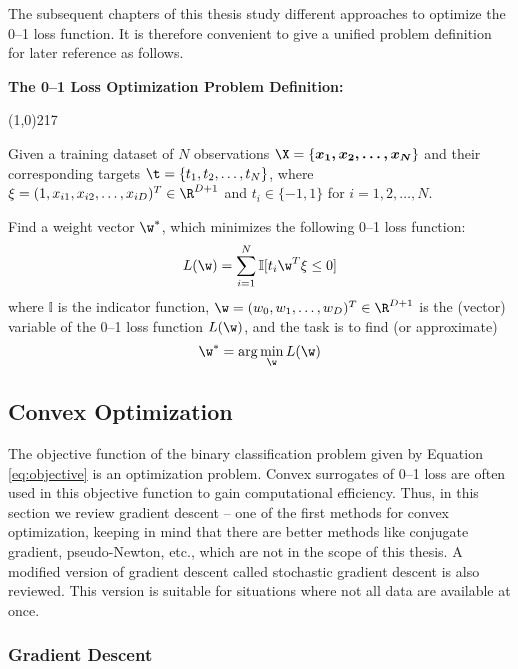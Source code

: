 The subsequent chapters of this thesis study different approaches to optimize the 0--1 loss function. It is therefore convenient to give a unified problem definition for later reference as follows.

\begin{framed}
\label{definition}
{\bf The 0--1 Loss Optimization Problem Definition:}

\line(1,0){217}

Given a training dataset of $N$ observations $\X = \{\boldsymbol{x_1, x_2, \dots, x_N}\}$ and their corresponding targets $\t = \{t_1, t_2, \dots, t_N\}$, where  $\xi =  (1, x_{i1}, x_{i2}, \dots, x_{iD})^T \in \R^{D+1}$ and $t_i \in \{ -1, 1 \}$ for $i=1,2,\dots, N$. 

Find a weight vector $\w^*$, which minimizes the following 0--1 loss function:
\begin{equation}
\label{01loss}
L(\w) = \sum_{i=1}^N \mathbb{I} [t_i \w^T \xi \leq 0]
\end{equation}
where $\mathbb{I}$ is the indicator function, ${\w} = (w_0, w_1, \dots, w_D)^T \in \R^{D+1}$ is the (vector) variable of the 0--1 loss function $L(\w)$, and the task is to find (or approximate) 
$${\w}^* = \arg\min_{\w} L({\w})$$
\end{framed}

\subsection{Convex Optimization}
\label{sec:bgr.convexopt}

The objective function of the binary classification problem given by Equation \ref{eq:objective} is an optimization problem. Convex surrogates of 0--1 loss are often used in this objective function to gain computational efficiency. Thus, in this section we review gradient descent -- one of the first methods for convex optimization, keeping in mind that there are better methods like conjugate gradient, pseudo-Newton, etc., which are not in the scope of this thesis. A modified version of gradient descent called stochastic gradient descent is also reviewed. This version is suitable for situations where not all data are available at once. 

\subsubsection{Gradient Descent}

